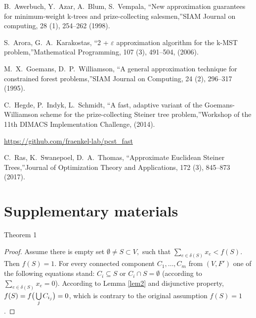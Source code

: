 \documentclass[11pt, tightenlines, twoside, onecolumn, nofloats, nobibnotes, nofootinbib, superscriptaddress, noshowpacks, centertags]{revtex4}
\begin{document}
\begin{thebibliography}{99}
 B.~Awerbuch, Y.~Azar, A.~Blum, S.~Vempala, \textquotedblleft New approximation guarantees for minimum-weight k-trees and prize-collecting salesmen,\textquotedblright SIAM Journal on computing, 28 (1), 254--262 (1998).

 S.~Arora, G.~A.~Karakostas, \textquotedblleft 2 + $\varepsilon$ approximation algorithm for the k-MST problem,\textquotedblright Mathematical Programming, 107 (3), 491--504, (2006).

 M.~X.~Goemans, D.~P.~Williamson, \textquotedblleft A general approximation technique for constrained forest problems,\textquotedblright SIAM Journal on Computing, 24 (2), 296--317 (1995).

 C.~Hegde, P.~Indyk, L.~Schmidt, \textquotedblleft A fast, adaptive variant of the Goemans-Williamson scheme for the prize-collecting Steiner tree problem,\textquotedblright Workshop of the 11th DIMACS Implementation Challenge, (2014).

\url{https://github.com/fraenkel-lab/pcst_fast}
 
 C.~Ras, K.~Swanepoel, D.~A.~Thomas, \textquotedblleft Approximate Euclidean Steiner Trees,\textquotedblright  Journal of Optimization Theory and Applications, 172 (3), 845--873 (2017).



\end{thebibliography}

\newpage

\section{Supplementary materials}

Theorem 1 \begin{proof}
    Assume there is empty set $\emptyset\not=S\subset V,$ such that $\sum\limits_{e\in \delta(S)}x_e < f(S)$.
    Then $f(S) = 1$. For every connected component $C_1,\ldots,C_m$ from $(V,F')$ one of the following equations stand:
    $C_i\subseteq S$ or $C_i\cap S = \emptyset$ (according to $\sum\limits_{e\in \delta(S)}x_e=0$). 
    According to Lemma \ref{lem2} and disjunctive property, $f(S) = f\big(\bigcup\limits_{j}C_{i_j}\big) = 0$, which is contrary to the original assumption $f(S) = 1$.
\end{proof}
\end{document}
